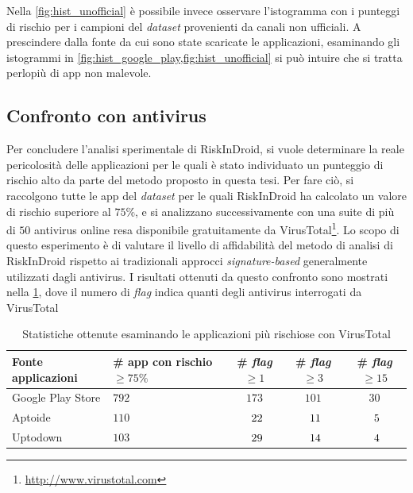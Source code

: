 \documentclass[12pt,a4paper,oneside]{article}
\begin{document}
\noindent Nella \cref{fig:hist_unofficial} è possibile invece osservare l'istogramma con i punteggi di rischio per i campioni del \textit{dataset} provenienti da canali non ufficiali. A prescindere dalla fonte da cui sono state scaricate le applicazioni, esaminando gli istogrammi in \cref{fig:hist_google_play,fig:hist_unofficial} si può intuire che si tratta perlopiù di app non malevole.



\subsection{Confronto con antivirus}

Per concludere l'analisi sperimentale di RiskInDroid, si vuole determinare la reale pericolosità delle applicazioni per le quali è stato individuato un punteggio di rischio alto da parte del metodo proposto in questa tesi. Per fare ciò, si raccolgono tutte le app del \textit{dataset} per le quali RiskInDroid ha calcolato un valore di rischio superiore al $75\%$, e si analizzano successivamente con una suite di più di $50$ antivirus online resa disponibile gratuitamente da VirusTotal\footnote{\url{http://www.virustotal.com}}. Lo scopo di questo esperimento è di valutare il livello di affidabilità del metodo di analisi di RiskInDroid rispetto ai tradizionali approcci \textit{signature-based} generalmente utilizzati dagli antivirus. I risultati ottenuti da questo confronto sono mostrati nella \cref{tab:perm_vs_signature}, dove il numero di \textit{flag} indica quanti degli antivirus interrogati da VirusTotal
\begin{table}[!htb]
    \renewcommand{\arraystretch}{1.3}
    \centering
    \begin{tabular}{|>{\centering\arraybackslash}m{}||>{\centering\arraybackslash}m{}|c|c|c|}
        \hline
        Fonte applicazioni & \# app con rischio $\geq 75\%$ & \# \textit{flag} $\geq 1$ & \# \textit{flag} $\geq 3$ & \# \textit{flag} $\geq 15$\\
        \hline\hline
        Google Play Store & $792$ & $173$ & $101$ & $30$\\\hline
        Aptoide & $110$ & $\hspace{.5em}22$ & $\hspace{.5em}11$ & $\hspace{.5em}5$\\\hline
        Uptodown & $103$ & $\hspace{.5em}29$ & $\hspace{.5em}14$ & $\hspace{.5em}4$\\\hline
    \end{tabular}
    \captionsetup{justification=centering}
    \caption{Statistiche ottenute esaminando le applicazioni più rischiose con VirusTotal}
    \label{tab:perm_vs_signature}
\end{table}
\end{document}
